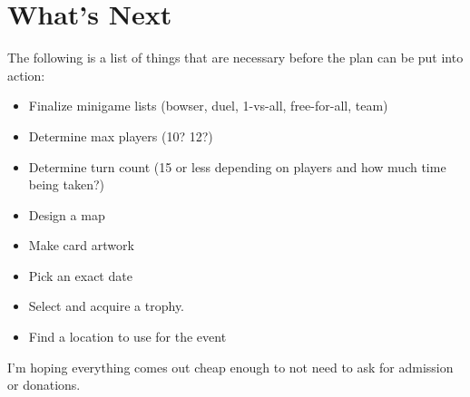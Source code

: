\documentclass{article}
\begin{document}
\section{What's Next}

The following is a list of things that are necessary before the plan can be put into action:

\begin{itemize}
\item Finalize minigame lists (bowser, duel, 1-vs-all, free-for-all, team)
\item Determine max players (10? 12?)
\item Determine turn count (15 or less depending on players and how much time being taken?)
\item Design a map
\item Make card artwork
\item Pick an exact date
\item Select and acquire a trophy.
\item Find a location to use for the event
\end{itemize}
\vspace*{2ex}

\noindent
I'm hoping everything comes out cheap enough to not need to ask for admission or donations.
\end{document}
